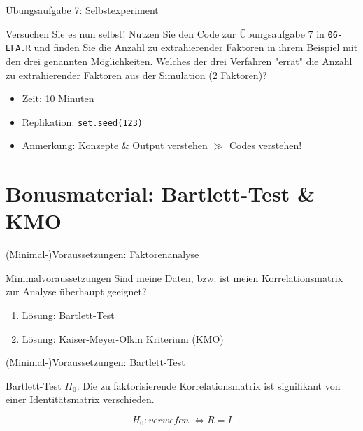 \documentclass[
  ignorenonframetext,
]{beamer}
\providecommand{\tightlist}{%
  \setlength{\itemsep}{0pt}\setlength{\parskip}{0pt}}
\begin{document}
\begin{frame}{Übungsaufgabe 7: Selbstexperiment}
\protect\hypertarget{uxfcbungsaufgabe-7-selbstexperiment}{}
\begin{example}
Versuchen Sie es nun selbst! Nutzen Sie den Code zur Übungsaufgabe 7 in
\texttt{06-EFA.R} und finden Sie die Anzahl zu extrahierender Faktoren in ihrem
Beispiel mit den drei genannten Möglichkeiten. Welches der drei Verfahren
"errät" die Anzahl zu extrahierender Faktoren aus der Simulation (2 Faktoren)? 
\end{example}

\begin{itemize}
\tightlist
\item
  Zeit: 10 Minuten
\item
  Replikation: \texttt{set.seed(123)}
\item
  Anmerkung: Konzepte \& Output verstehen \(\gg\) Codes verstehen!
\end{itemize}
\end{frame}

\hypertarget{bonusmaterial-bartlett-test-kmo}{%
\section{Bonusmaterial: Bartlett-Test \&
KMO}\label{bonusmaterial-bartlett-test-kmo}}

\begin{frame}{(Minimal-)Voraussetzungen: Faktorenanalyse}
\protect\hypertarget{minimal-voraussetzungen-faktorenanalyse}{}
\begin{block}{Minimalvoraussetzungen}
Sind meine Daten, bzw. ist meien Korrelationsmatrix zur Analyse überhaupt
geeignet?
\end{block}

\begin{enumerate}
\tightlist
\item
  Lösung: Bartlett-Test
\item
  Lösung: Kaiser-Meyer-Olkin Kriterium (KMO)
\end{enumerate}
\end{frame}

\begin{frame}{(Minimal-)Voraussetzungen: Bartlett-Test}
\protect\hypertarget{minimal-voraussetzungen-bartlett-test}{}
\begin{block}{Bartlett-Test}
$H_0$: Die zu faktorisierende Korrelationsmatrix ist signifikant von einer
Identitätsmatrix verschieden.
\end{block}

\begin{equation}
  H_0: verwefen \; \Leftrightarrow R = I
\end{equation}
\end{frame}
\end{document}
